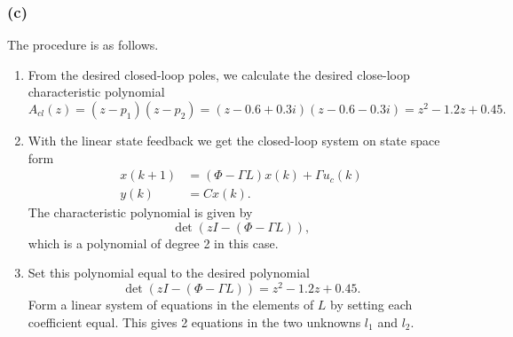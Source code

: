 \documentclass[a4paper]{scrartcl}
\begin{document}
\subsubsection*{(c)}
\label{sec-4-3-3}
The procedure is as follows. 
\begin{enumerate}
\item From the desired closed-loop poles, we calculate the desired close-loop characteristic polynomial
\[ A_{cl}(z) = (z-p_1)(z - p_2) = (z-0.6+0.3i)(z-0.6-0.3i) = z^2 -1.2z + 0.45.\]
\item With the linear state feedback we get the closed-loop system on state space form
\begin{equation*}
 \begin{split}
 x(k+1) &= \left(\Phi - \Gamma L\right)x(k) + \Gamma u_c(k)\\
 y(k) &= C x(k).
 \end{split}
\end{equation*}
The characteristic polynomial is given by
\[ \det \left(zI - (\Phi - \Gamma L)\right), \]
which is a polynomial of degree 2 in this case.
\item Set this polynomial equal to the desired polynomial
\[ \det \left(zI - (\Phi - \Gamma L)\right) = z^2 - 1.2z + 0.45. \]
Form a linear system of equations in the elements of $L$ by setting each coefficient equal. This gives 2 equations in the two unknowns $l_1$ and $l_2$.
\end{enumerate}
\end{document}
